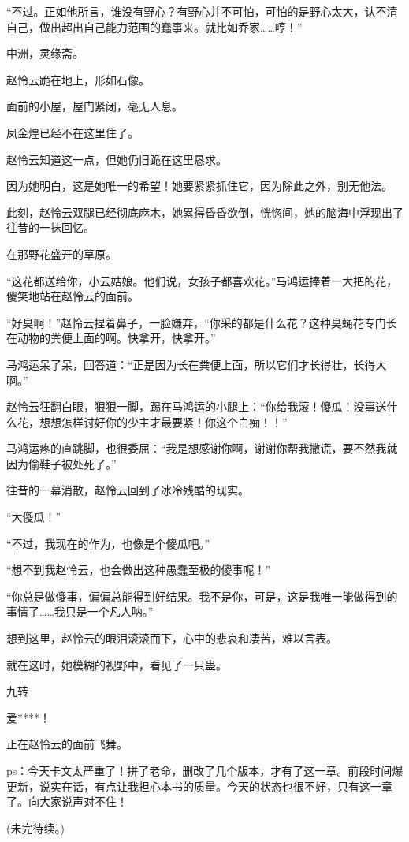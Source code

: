 \begin{this_body}
“不过。正如他所言，谁没有野心？有野心并不可怕，可怕的是野心太大，认不清自己，做出超出自己能力范围的蠢事来。就比如乔家……哼！”

中洲，灵缘斋。

赵怜云跪在地上，形如石像。

面前的小屋，屋门紧闭，毫无人息。

凤金煌已经不在这里住了。

赵怜云知道这一点，但她仍旧跪在这里恳求。

因为她明白，这是她唯一的希望！她要紧紧抓住它，因为除此之外，别无他法。

此刻，赵怜云双腿已经彻底麻木，她累得昏昏欲倒，恍惚间，她的脑海中浮现出了往昔的一抹回忆。

在那野花盛开的草原。

“这花都送给你，小云姑娘。他们说，女孩子都喜欢花。”马鸿运捧着一大把的花，傻笑地站在赵怜云的面前。

“好臭啊！”赵怜云捏着鼻子，一脸嫌弃，“你采的都是什么花？这种臭蝇花专门长在动物的粪便上面的啊。快拿开，快拿开。”

马鸿运呆了呆，回答道：“正是因为长在粪便上面，所以它们才长得壮，长得大啊。”

赵怜云狂翻白眼，狠狠一脚，踢在马鸿运的小腿上：“你给我滚！傻瓜！没事送什么花，想想怎样讨好你的少主才最要紧！你这个白痴！！”

马鸿运疼的直跳脚，也很委屈：“我是想感谢你啊，谢谢你帮我撒谎，要不然我就因为偷鞋子被处死了。”

往昔的一幕消散，赵怜云回到了冰冷残酷的现实。

“大傻瓜！”

“不过，我现在的作为，也像是个傻瓜吧。”

“想不到我赵怜云，也会做出这种愚蠢至极的傻事呢！”

“你总是做傻事，偏偏总能得到好结果。我不是你，可是，这是我唯一能做得到的事情了……我只是一个凡人呐。”

想到这里，赵怜云的眼泪滚滚而下，心中的悲哀和凄苦，难以言表。

就在这时，她模糊的视野中，看见了一只蛊。

九转

爱****！

正在赵怜云的面前飞舞。

ps：今天卡文太严重了！拼了老命，删改了几个版本，才有了这一章。前段时间爆更新，说实在话，有点让我担心本书的质量。今天的状态也很不好，只有这一章了。向大家说声对不住！

(未完待续。)

\end{this_body}

